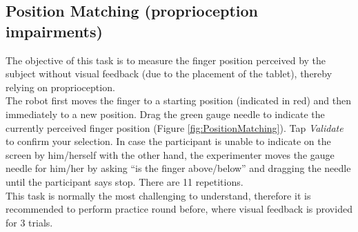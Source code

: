 \documentclass[10pt,oneside,a4paper]{article}
\begin{document}
\subsection{Position Matching (proprioception impairments)}
The objective of this task is to measure the finger position perceived by the subject without visual feedback (due to the placement of the tablet), thereby relying on proprioception.\\

The robot first moves the finger to a starting position (indicated in red) and then immediately to a new position. Drag the green gauge needle to indicate the currently perceived finger position (Figure \ref{fig:PositionMatching}). Tap \emph{Validate} to confirm your selection. In case the participant is unable to indicate on the screen by him/herself with the other hand, the experimenter moves the gauge needle for him/her by asking “is the finger above/below” and dragging the needle until the participant says stop. There are 11 repetitions.\\

This task is normally the most challenging to understand, therefore it is recommended to perform practice round before, where visual feedback is provided for 3 trials. 
\end{document}
